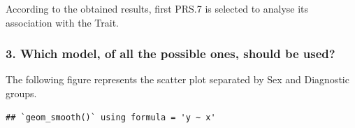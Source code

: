 \documentclass[
]{article}
\newenvironment{Shaded}{\begin{snugshade}}{\end{snugshade}}
\newcommand{\AttributeTok}[1]{\textcolor[rgb]{0.77,0.63,0.00}{#1}}
\newcommand{\CommentTok}[1]{\textcolor[rgb]{0.56,0.35,0.01}{\textit{#1}}}
\newcommand{\ConstantTok}[1]{\textcolor[rgb]{0.00,0.00,0.00}{#1}}
\newcommand{\DecValTok}[1]{\textcolor[rgb]{0.00,0.00,0.81}{#1}}
\newcommand{\FloatTok}[1]{\textcolor[rgb]{0.00,0.00,0.81}{#1}}
\newcommand{\FunctionTok}[1]{\textcolor[rgb]{0.00,0.00,0.00}{#1}}
\newcommand{\NormalTok}[1]{#1}
\newcommand{\OtherTok}[1]{\textcolor[rgb]{0.56,0.35,0.01}{#1}}
\newcommand{\SpecialCharTok}[1]{\textcolor[rgb]{0.00,0.00,0.00}{#1}}
\begin{document}
According to the obtained results, first PRS.7 is selected to analyse
its association with the Trait.

\hypertarget{which-model-of-all-the-possible-ones-should-be-used}{%
\subsubsection{3. Which model, of all the possible ones, should be
used?}\label{which-model-of-all-the-possible-ones-should-be-used}}

The following figure represents the scatter plot separated by Sex and
Diagnostic groups.

\begin{Shaded}
\end{Shaded}

\begin{verbatim}
## `geom_smooth()` using formula = 'y ~ x'
\end{verbatim}
\end{document}
